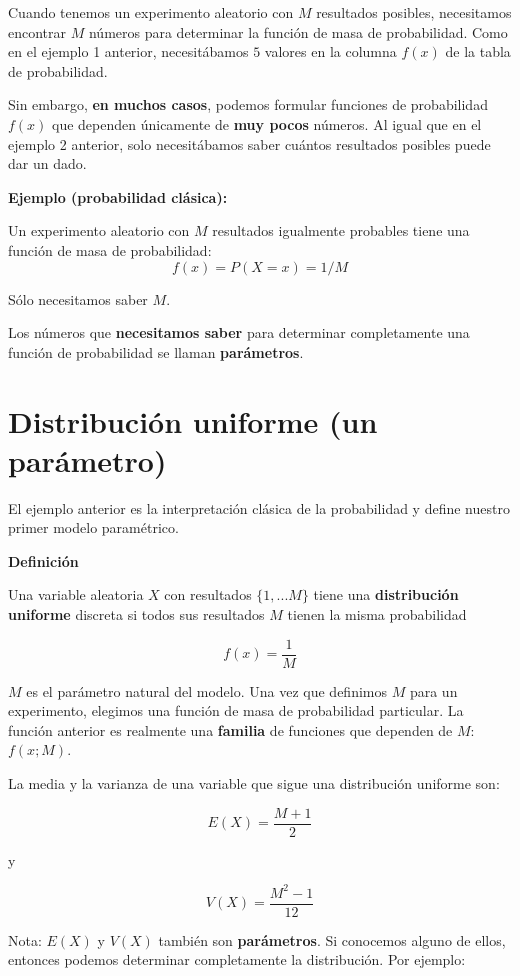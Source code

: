 \documentclass[
]{book}
\begin{document}
Cuando tenemos un experimento aleatorio con \(M\) resultados posibles, necesitamos encontrar \(M\) números para determinar la función de masa de probabilidad. Como en el ejemplo 1 anterior, necesitábamos \(5\) valores en la columna \(f(x)\) de la tabla de probabilidad.

Sin embargo, \textbf{en muchos casos}, podemos formular funciones de probabilidad \(f(x)\) que dependen únicamente de \textbf{muy pocos} números. Al igual que en el ejemplo 2 anterior, solo necesitábamos saber cuántos resultados posibles puede dar un dado.

\textbf{Ejemplo (probabilidad clásica):}

Un experimento aleatorio con \(M\) resultados igualmente probables tiene una función de masa de probabilidad:
\[f(x)=P(X=x)=1/M\]

Sólo necesitamos saber \(M\).

Los números que \textbf{necesitamos saber} para determinar completamente una función de probabilidad se llaman \textbf{parámetros}.

\hypertarget{distribuciuxf3n-uniforme-un-paruxe1metro}{%
\section{Distribución uniforme (un parámetro)}\label{distribuciuxf3n-uniforme-un-paruxe1metro}}

El ejemplo anterior es la interpretación clásica de la probabilidad y define nuestro primer modelo paramétrico.

\textbf{Definición}

Una variable aleatoria \(X\) con resultados \(\{1,...M\}\) tiene una \textbf{distribución uniforme} discreta si todos sus resultados \(M\) tienen la misma probabilidad

\[f(x)=\frac{1}{M}\]

\(M\) es el parámetro natural del modelo. Una vez que definimos \(M\) para un experimento, elegimos una función de masa de probabilidad particular. La función anterior es realmente una \textbf{familia} de funciones que dependen de \(M\): \(f(x; M)\).

La media y la varianza de una variable que sigue una distribución uniforme son:

\[E(X)= \frac{M+1}{2}\]

y

\[V(X)= \frac{M^2-1}{12}\]

Nota: \(E(X)\) y \(V(X)\) también son \textbf{parámetros}. Si conocemos alguno de ellos, entonces podemos determinar completamente la distribución. Por ejemplo:
\end{document}
